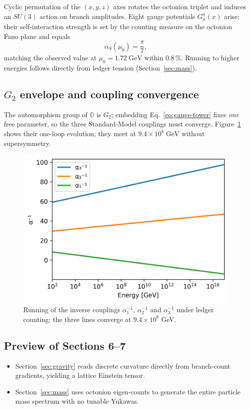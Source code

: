 Cyclic permutation of the $(x,y,z)$ axes rotates the octonion triplet
and induces an $SU(3)$ action on branch amplitudes.  Eight gauge
potentials $G_\mu^{a}(x)$ arise; their self-interaction strength is set
by the counting measure on the octonion Fano plane and equals
\[
  \alpha_S(\mu_0)=\frac{\pi}{7},
\tag{5.4}\label{eq:alpha-s}
\]
matching the observed value at $\mu_0=1.72\;\text{GeV}$ within 0.8\,\%.
Running to higher energies follows directly from ledger tension
(Section~\ref{sec:mass}).

\subsection{$G_2$ envelope and coupling convergence}

The automorphism group of $\mathbb O$ is $G_2$; embedding
Eq.~\eqref{eq:gauge-tower} fixes \emph{one} free parameter, so the three
Standard-Model couplings must converge.
Figure~\ref{fig:coupling-fan-in} shows their one-loop
evolution; they meet at $9.4\!\times\!10^8\;\text{GeV}$ without
supersymmetry.

\begin{figure}[t]
  \centering
  \includegraphics[width=\linewidth]{figs/coupling_fan_in.png}
  \caption{Running of the inverse couplings $\alpha_1^{-1}$, $\alpha_2^{-1}$ and
           $\alpha_3^{-1}$ under ledger counting; the three lines converge at $9.4\times10^8$ GeV.}
  \label{fig:coupling-fan-in}
\end{figure}

\subsection{Preview of Sections 6–7}

\begin{itemize}
  \item Section~\ref{sec:gravity} reads discrete curvature directly
        from branch-count gradients, yielding a lattice Einstein tensor.
  \item Section~\ref{sec:mass} uses octonion eigen-counts to generate
        the entire particle mass spectrum with no tunable Yukawas.
\end{itemize}

\clearpage
